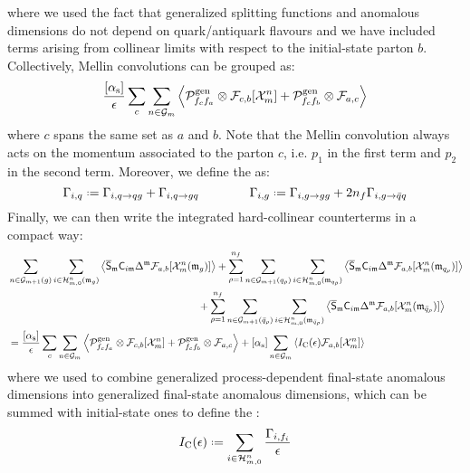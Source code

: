 where we used the fact that generalized splitting functions and anomalous dimensions do not depend on quark/antiquark flavours and we have included terms arising from collinear limits with respect to the initial-state parton $ b $. Collectively, Mellin convolutions can be grouped as:
\begin{equation*}
  \frac{[\alpha_\text{s}]}{\epsilon} \sum_c \sum_{n \in \mathcal{G}_m} \left\langle \mathcal{P}^\text{gen}_{f_c f_a} \otimes \mathcal{F}_{c,b}[\mathcal{X}^{n}_{m}] + \mathcal{P}^\text{gen}_{f_c f_b} \otimes \mathcal{F}_{a,c} \right\rangle
\end{equation*}
where $ c $ spans the same set as $ a $ and $ b $. Note that the Mellin convolution always acts on the momentum associated to the parton $ c $, i.e. $ p_1 $ in the first term and $ p_2 $ in the second term. Moreover, we define the  as:
\begin{equation}
  \Gamma_{i,q} \defeq \Gamma_{i , q \rightarrow q g} + \Gamma_{i , q \rightarrow g q}
  \qquad \qquad
  \Gamma_{i,g} \defeq \Gamma_{i , g \rightarrow g g} + 2n_f \Gamma_{i , g \rightarrow \bar{q} q}
  \label{eq:fin-gen-an-dim}
\end{equation}
Finally, we can then write the integrated hard-collinear counterterms in a compact way:
\begin{equation*}
  \begin{split}
    & \sum_{n \in \mathcal{G}_{m+1}(g)} \sum_{i \in \mathcal{H}^{n}_{m,0}(\mathfrak{m}_g)} \left\langle \overline{\mathsf{S}}_{\mathfrak{m}} \mathsf{C}_{i\mathfrak{m}} \Delta^{\mathfrak{m}} \mathcal{F}_{a,b}[\mathcal{X}^{n}_{m}(\mathfrak{m}_g)] \right\rangle + \sum_{\rho = 1}^{n_f} \sum_{n \in \mathcal{G}_{m+1}(q_\rho)} \sum_{i \in \mathcal{H}^{n}_{m,0}(\mathfrak{m}_{q_\rho})} \left\langle \overline{\mathsf{S}}_{\mathfrak{m}} \mathsf{C}_{i\mathfrak{m}} \Delta^{\mathfrak{m}} \mathcal{F}_{a,b}[\mathcal{X}^{n}_{m}(\mathfrak{m}_{q_\rho})] \right\rangle \\
    & \qquad \qquad \qquad \qquad \qquad \qquad \qquad \qquad \qquad \,\, + \sum_{\rho = 1}^{n_f} \sum_{n \in \mathcal{G}_{m+1}(\bar{q}_\rho)} \sum_{i \in \mathcal{H}^{n}_{m,0}(\mathfrak{m}_{\bar{q}_\rho})} \left\langle \overline{\mathsf{S}}_{\mathfrak{m}} \mathsf{C}_{i\mathfrak{m}} \Delta^{\mathfrak{m}} \mathcal{F}_{a,b}[\mathcal{X}^{n}_{m}(\mathfrak{m}_{\bar{q}_\rho})] \right\rangle \\
    & = \frac{[\alpha_\text{s}]}{\epsilon} \sum_c \sum_{n \in \mathcal{G}_m} \left\langle \mathcal{P}^\text{gen}_{f_c f_a} \otimes \mathcal{F}_{c,b}[\mathcal{X}^{n}_{m}] + \mathcal{P}^\text{gen}_{f_c f_b} \otimes \mathcal{F}_{a,c} \right\rangle + [\alpha_\text{s}] \sum_{n \in \mathcal{G}_m} \left\langle I_\text{C}(\epsilon) \mathcal{F}_{a,b}[\mathcal{X}^{n}_{m}] \right\rangle
  \end{split}
\end{equation*}
where we used  to combine generalized process-dependent final-state anomalous dimensions into generalized final-state anomalous dimensions, which can be summed with initial-state ones to define the :
\begin{equation}
  \ico(\de) \defeq \sum_{i \in \prt{n}{m}} \frac{\Gamma_{i,f_i}}{\de}
\end{equation}
